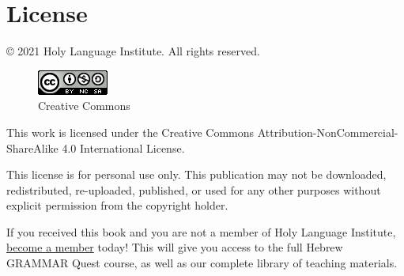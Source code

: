 \documentclass[
]{turabian-researchpaper}
\begin{document}
\hypertarget{license}{%
\section*{License}\label{license}}

© 2021 Holy Language Institute. All rights reserved.

\begin{figure}
\centering
\includegraphics{images/by-nc-sa.png}
\caption{Creative Commons}
\end{figure}

This work is licensed under the Creative Commons Attribution-NonCommercial-ShareAlike 4.0 International License.

This license is for personal use only. This publication may not be downloaded, redistributed, re-uploaded, published, or used for any other purposes without explicit permission from the copyright holder.

If you received this book and you are not a member of Holy Language Institute, \href{https://holylanguage.com/subscribe.html}{become a member} today! This will give you access to the full Hebrew GRAMMAR Quest course, as well as our complete library of teaching materials.

  
\end{document}

